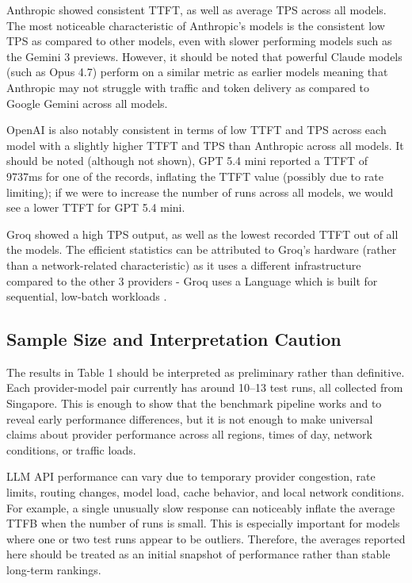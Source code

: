 \documentclass[11pt, a4paper]{article}
\begin{document}
Anthropic showed consistent TTFT, as well as average TPS across all models. The most noticeable characteristic of Anthropic’s models is the consistent low TPS as compared to other models, even with slower performing models such as the Gemini 3 previews. However, it should be noted that powerful Claude models (such as Opus 4.7) perform on a similar metric as earlier models meaning that Anthropic may not struggle with traffic and token delivery as compared to Google Gemini across all models.

OpenAI is also notably consistent in terms of low TTFT and TPS across each model with a slightly higher TTFT and TPS than Anthropic across all models. It should be noted (although not shown), GPT 5.4 mini reported a TTFT of 9737ms for one of the records, inflating the TTFT value (possibly due to rate limiting); if we were to increase the number of runs across all models, we would see a lower TTFT for GPT 5.4 mini.

Groq showed a high TPS output, as well as the lowest recorded TTFT out of all the models. The efficient statistics can be attributed to Groq’s hardware (rather than a network-related characteristic)  as it uses a different infrastructure compared to the other 3 providers - Groq uses a Language which is built for sequential, low-batch workloads \cite{nvidiagroq}.

\subsection{Sample Size and Interpretation Caution}

The results in Table 1 should be interpreted as preliminary rather than definitive. Each provider-model pair currently has around 10--13 test runs, all collected from Singapore. This is enough to show that the benchmark pipeline works and to reveal early performance differences, but it is not enough to make universal claims about provider performance across all regions, times of day, network conditions, or traffic loads.

LLM API performance can vary due to temporary provider congestion, rate limits, routing changes, model load, cache behavior, and local network conditions. For example, a single unusually slow response can noticeably inflate the average TTFB when the number of runs is small. This is especially important for models where one or two test runs appear to be outliers. Therefore, the averages reported here should be treated as an initial snapshot of performance rather than stable long-term rankings.
\end{document}
